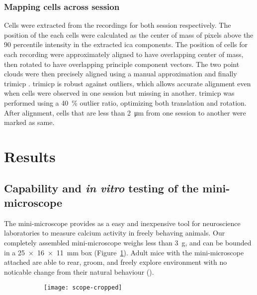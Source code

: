 \subsubsection{Mapping cells across session}
Cells were extracted from the recordings for both session respectively. The position of the each cells were calculated as the center of mass of pixels above the \num{90} percentile intensity in the extracted \gls{ica} components. The position of cells for each recording were approximately aligned to have overlapping center of mass, then rotated to have overlapping principle component vectors. The two point clouds were then precisely aligned using a manual approximation and finally \gls{trimicp} \citep{chetverikov02}. \Gls{trimicp} is robust against outliers, which allows accurate alignment even when cells were observed in one session but missing in another. \Gls{trimicp} was performed using a \SI{40}{\percent} outlier ratio, optimizing both translation and rotation. After alignment, cells that are less than \SI{2}{\um} from one session to another were marked as same. 


\section{Results}

\subsection{Capability and \textit{in vitro} testing of the mini-microscope}
The mini-microscope provides as a easy and inexpensive tool for neuroscience laboratories to measure calcium activity in freely behaving animals. Our completely assembled mini-microscope weighs less than \SI{3}{\g}, and can be bounded in a \SI{25 x 16 x 11}{\mm} box (Figure~\ref{f.scope}). Adult mice with the mini-microscope attached are able to rear, groom, and freely explore environment with no noticable change from their natural behaviour ().

\begin{figure}[h]
    \begin{subfigure}[t]{.5\textwidth}
        \centering
        \texttt{[image: scope-cropped]}
        \caption{\label{f.scope}}
    \end{subfigure}
    \begin{subfigure}[t]{.5\textwidth}
        \centering
    \end{subfigure}
\end{figure}

